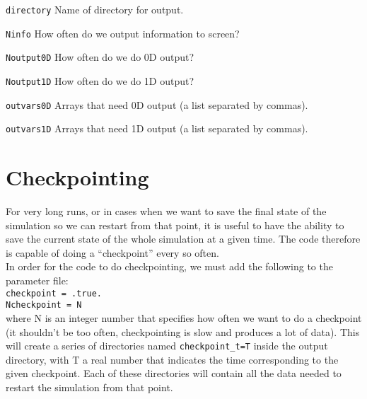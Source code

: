 \documentclass[12pt]{article}
\begin{document}
\begin{list}{}{
\setlength{\leftmargin}{35mm}
\setlength{\labelsep}{10mm}
\setlength{\labelwidth}{20mm}}

\item[\texttt{directory}] Name of directory for output.

\item[\texttt{Ninfo}] How often do we output information to screen?

\item[\texttt{Noutput0D}] How often do we do 0D output?

\item[\texttt{Noutput1D}] How often do we do 1D output?

\item[\texttt{outvars0D}] Arrays that need 0D output (a list separated by commas).

\item[\texttt{outvars1D}] Arrays that need 1D output (a list separated by commas).

\end{list}

\vspace{3mm}



\setcounter{equation}{0}
\section{Checkpointing}
\label{sec:checkpoint}

For very long runs, or in cases when we want to save the final state
of the simulation so we can restart from that point, it is useful to
have the ability to save the current state of the whole simulation at
a given time. The code therefore is capable of doing a ``checkpoint''
every so often. \\

In order for the code to do checkpointing, we must add the following
to the parameter file: \\

\texttt{checkpoint = .true.} \\
\texttt{Ncheckpoint = N} \\

\noindent where N is an integer number that specifies how often we
want to do a checkpoint (it shouldn't be too often, checkpointing is
slow and produces a lot of data).  This will create a series of
directories named \texttt{checkpoint\_t=T} inside the output
directory, with T a real number that indicates the time corresponding
to the given checkpoint. Each of these directories will contain all
the data needed to restart the simulation from that point. \\
\end{document}
